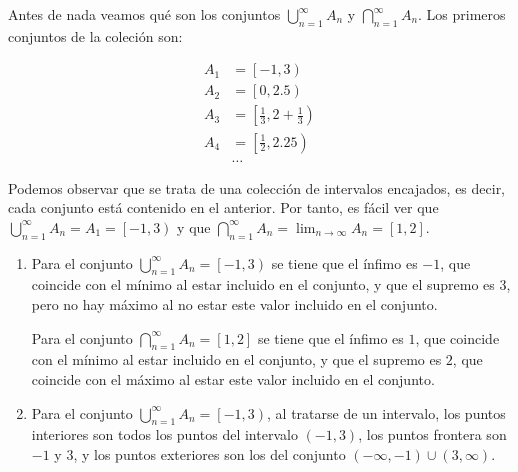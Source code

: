 \documentclass[
  spanish,
  a4paper,
]{scrreport}
\theoremstyle{definition}
\theoremstyle{remark}
\begin{document}
\begin{tcolorbox}[enhanced jigsaw, arc=.35mm, bottomrule=.15mm, bottomtitle=1mm, breakable, colback=white, colbacktitle=quarto-callout-tip-color!10!white, colframe=quarto-callout-tip-color-frame, coltitle=black, left=2mm, leftrule=.75mm, opacityback=0, opacitybacktitle=0.6, rightrule=.15mm, title=\textcolor{quarto-callout-tip-color}{\faLightbulb}\hspace{0.5em}{Solución}, titlerule=0mm, toprule=.15mm, toptitle=1mm]

Antes de nada veamos qué son los conjuntos
\(\bigcup_{n=1}^{\infty} A_n\) y \(\bigcap_{n=1}^{\infty} A_n\). Los
primeros conjuntos de la coleción son:

\begin{align*}
A_1 & = \left[-1, 3\right) \\
A_2 & = \left[0, 2.5\right) \\
A_3 & = \left[\frac{1}{3}, 2+\frac{1}{3}\right) \\
A_4 & = \left[\frac{1}{2}, 2.25\right) \\
& \ldots
\end{align*}

Podemos observar que se trata de una colección de intervalos encajados,
es decir, cada conjunto está contenido en el anterior. Por tanto, es
fácil ver que \(\bigcup_{n=1}^{\infty} A_n = A_1 = \left[-1, 3\right)\)
y que \(\bigcap_{n=1}^{\infty} A_n = \lim_{n \to \infty} A_n = [1, 2]\).

\begin{enumerate}
\def\labelenumi{\alph{enumi}.}
\item
  Para el conjunto \(\bigcup_{n=1}^{\infty} A_n = \left[-1, 3\right)\)
  se tiene que el ínfimo es \(-1\), que coincide con el mínimo al estar
  incluido en el conjunto, y que el supremo es \(3\), pero no hay máximo
  al no estar este valor incluido en el conjunto.

  Para el conjunto \(\bigcap_{n=1}^{\infty} A_n = [1, 2]\) se tiene que
  el ínfimo es \(1\), que coincide con el mínimo al estar incluido en el
  conjunto, y que el supremo es \(2\), que coincide con el máximo al
  estar este valor incluido en el conjunto.
\item
  Para el conjunto \(\bigcup_{n=1}^{\infty} A_n = \left[-1, 3\right)\),
  al tratarse de un intervalo, los puntos interiores son todos los
  puntos del intervalo \((-1, 3)\), los puntos frontera son \(-1\) y
  \(3\), y los puntos exteriores son los del conjunto
  \((-\infty, -1) \cup (3, \infty)\).


\end{enumerate}
\end{tcolorbox}
\end{document}
